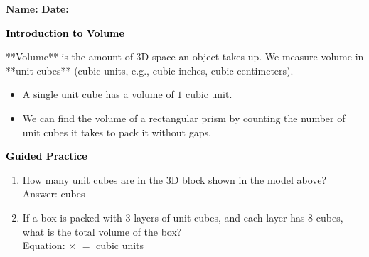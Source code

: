 \documentclass[12pt, letterpaper, fleqn]{article}
\newcommand{\blank}{\underline{\hspace{2.2cm}}}
\begin{document}
\textbf{Name:} \underline{\hspace{5cm}}
\hfill
\textbf{Date:} \underline{\hspace{3cm}}\\

\begin{tcolorbox}[colback=customteal!20]
    \large\textcolor{black}{\textbf{Introduction to Volume}}
\end{tcolorbox}

\vspace{3mm}
\noindent
**Volume** is the amount of 3D space an object takes up.
We measure volume in **unit cubes** (cubic units, e.g., cubic inches, cubic centimeters).
\begin{itemize}
    \item A single unit cube has a volume of $1\text{ cubic unit}$.
    \item We can find the volume of a rectangular prism by counting the number of unit cubes it takes to pack it without gaps.
\end{itemize}

\begin{center}
\end{center}

\newpage
\begin{tcolorbox}[colback=customteal!20]
    \large\textcolor{black}{\textbf{Guided Practice}}
\end{tcolorbox}

\vspace{5mm}
\begin{enumerate}[itemsep=3cm, leftmargin=0.6cm]
\item How many unit cubes are in the 3D block shown in the model above?
\\
Answer: \blank cubes

\item If a box is packed with 3 layers of unit cubes, and each layer has 8 cubes, what is the total volume of the box?
\\
Equation: \blank $\times$ \blank $=$ \blank cubic units
\end{enumerate}
\end{document}
